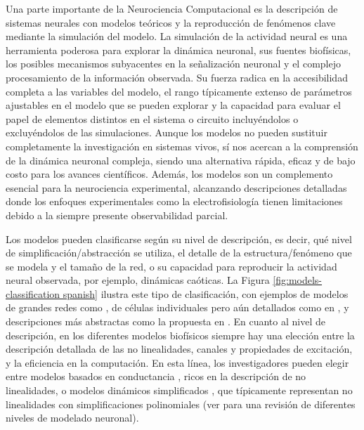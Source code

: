 Una parte importante de la Neurociencia Computacional es la descripción de sistemas neurales con modelos teóricos y la reproducción de fenómenos clave mediante la simulación del modelo. La simulación de la actividad neural es una herramienta poderosa para explorar la dinámica neuronal, sus fuentes biofísicas, los posibles mecanismos subyacentes en la señalización neuronal y el complejo procesamiento de la información observada. Su fuerza radica en la accesibilidad completa a las variables del modelo, el rango típicamente extenso de parámetros ajustables en el modelo que se pueden explorar y la capacidad para evaluar el papel de elementos distintos en el sistema o circuito incluyéndolos o excluyéndolos de las simulaciones. Aunque los modelos no pueden sustituir completamente la investigación en sistemas vivos, sí nos acercan a la comprensión de la dinámica neuronal compleja, siendo una alternativa rápida, eficaz y de bajo costo para los avances científicos. Además, los modelos son un complemento esencial para la neurociencia experimental, alcanzando descripciones detalladas donde los enfoques experimentales como la electrofisiología tienen limitaciones debido a la siempre presente observabilidad parcial.

Los modelos pueden clasificarse según su nivel de descripción, es decir, qué nivel de simplificación/abstracción se utiliza, el detalle de la estructura/fenómeno que se modela y el tamaño de la red, o su capacidad para reproducir la actividad neural observada, por ejemplo, dinámicas caóticas. La Figura \ref{fig:models-classification spanish} ilustra este tipo de clasificación, con ejemplos de modelos de grandes redes como \cite{potjans_cell-type_2014,bezaire_interneuronal_2016}, de células individuales pero aún detallados como en \cite{smith_dendritic_2013}, y descripciones más abstractas como la propuesta en \cite{izhikevich_simple_2003}. En cuanto al nivel de descripción, en los diferentes modelos biofísicos siempre hay una elección entre la descripción detallada de las no linealidades, canales y propiedades de excitación, y la eficiencia en la computación. En esta línea, los investigadores pueden elegir entre modelos basados en conductancia \cite{hodgkin_quantitative_1952}, ricos en la descripción de no linealidades, o modelos dinámicos simplificados \cite{hindmarsh_model_1984,fitzhugh_impulses_1961}, que típicamente representan no linealidades con simplificaciones polinomiales (ver \cite{torres_modeling_2012} para una revisión de diferentes niveles de modelado neuronal).

